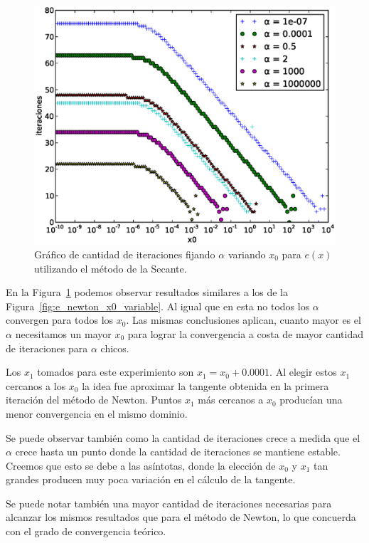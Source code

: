 \begin{figure}[!htbp]
  \begin{center}
    \includegraphics[scale=0.5]{graficos/new/e_secante_x0_variable.eps}
    \caption{\label{fig:e_secante_x0_variable} Gráfico de cantidad de iteraciones fijando $\alpha$ variando $x_0$ para $e(x)$ utilizando el método de la Secante.}
  \end{center}
\end{figure}

En la Figura~\ref{fig:e_secante_x0_variable} podemos observar resultados
similares a los de la Figura~\ref{fig:e_newton_x0_variable}. Al igual que en
esta no todos los $\alpha$ convergen para todos los $x_0$. Las mismas
conclusiones aplican, cuanto mayor es el $\alpha$ necesitamos un mayor $x_0$
para lograr la convergencia a costa de mayor cantidad de iteraciones para
$\alpha$ chicos.

Los $x_1$ tomados para este experimiento son $x_1 = x_0 + 0.0001$. Al elegir
estos $x_1$ cercanos a los $x_0$ la idea fue aproximar la tangente obtenida en
la primera iteración del método de Newton. Puntos $x_1$ más cercanos a $x_0$
producían una menor convergencia en el mismo dominio.

Se puede observar también como la cantidad de iteraciones crece a medida que el
$\alpha$ crece hasta un punto donde la cantidad de iteraciones se mantiene
estable. Creemos que esto se debe a las asíntotas, donde la elección de $x_0$ y
$x_1$ tan grandes producen muy poca variación en el cálculo de la tangente.

Se puede notar también una mayor cantidad de iteraciones necesarias para
alcanzar los mismos resultados que para el método de Newton, lo que concuerda
con el grado de convergencia teórico.

